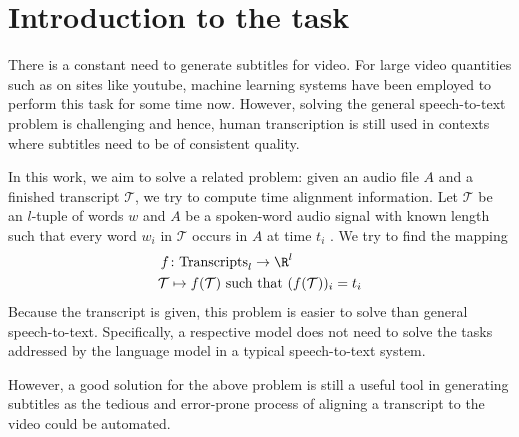 \chapter{Introduction to the task}

There is a constant need to generate subtitles for video. For large video quantities such as on sites like youtube, machine learning systems have been employed to perform this task for some time now. However, solving the general speech-to-text problem is challenging and hence, human transcription is still used in contexts where subtitles need to be of consistent quality.

In this work, we aim to solve a related problem: given an audio file $A$ and a finished transcript $\mathcal{T}$, we try to compute time alignment information. Let $\mathcal{T}$ be an $l$-tuple of words $w$ and $A$ be a spoken-word audio signal with known length such that every word $w_i$ in $\mathcal{T}$ occurs in $A$ at time $t_i$ . We try to find the mapping
\begin{align*}
	f&\colon\textrm{Transcripts}_l\to\R^l\\
	\mathcal{T}&\mapsto f(\mathcal{T})\textrm{ such that }(f(\mathcal{T}))_i=t_i
\end{align*}
Because the transcript is given, this problem is easier to solve than general speech-to-text. Specifically, a respective model does not need to solve the tasks addressed by the language model in a typical speech-to-text system.

However, a good solution for the above problem is still a useful tool in generating subtitles as the tedious and error-prone process of aligning a transcript to the video could be automated.